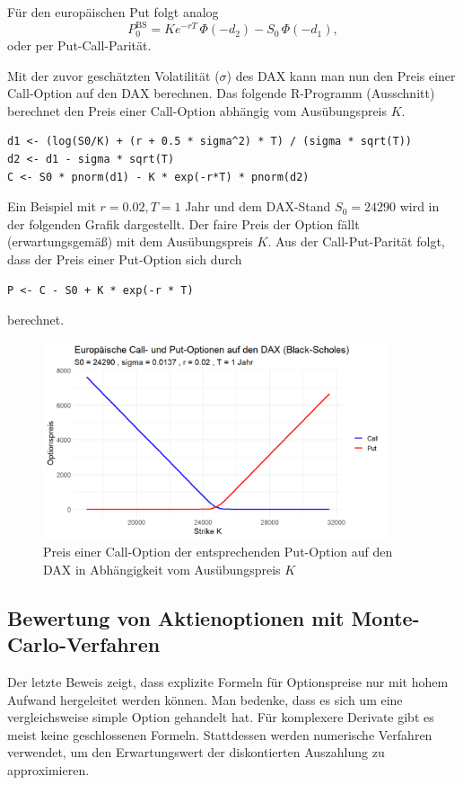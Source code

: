 \begin{bem}
Für den europäischen Put folgt analog
$$
P_0^{\mathrm{BS}} = K e^{-rT}\,\Phi(-d_2) - S_0\,\Phi(-d_1),
$$
oder per Put-Call-Parität.

\end{bem}

\begin{bsp}
Mit der zuvor geschätzten Volatilität ($\sigma$) des DAX kann
man nun den Preis einer Call-Option auf den DAX berechnen. Das folgende
R-Programm (Ausschnitt) berechnet den Preis einer Call-Option abhängig
vom Ausübungspreis $K$.

\begin{lstlisting}
d1 <- (log(S0/K) + (r + 0.5 * sigma^2) * T) / (sigma * sqrt(T))
d2 <- d1 - sigma * sqrt(T)
C <- S0 * pnorm(d1) - K * exp(-r*T) * pnorm(d2)
\end{lstlisting}
Ein Beispiel mit $r = 0.02, T = 1$ Jahr und dem DAX-Stand $S_0 = 24290$ wird in
der folgenden Grafik dargestellt. Der faire Preis der Option
fällt (erwartungsgemäß) mit dem Ausübungspreis $K$.
Aus der Call-Put-Parität folgt, dass der Preis einer Put-Option
sich durch

\begin{lstlisting}
P <- C - S0 + K * exp(-r * T)
\end{lstlisting}
berechnet.

\begin{figure}[H]
    \centering
    \includegraphics[width=0.9\textwidth]{images/dax_bs.png}
    \caption{Preis einer Call-Option der entsprechenden Put-Option auf den DAX in Abhängigkeit vom Ausübungspreis $K$}
    \label{fig:dax_bs}
\end{figure}

\end{bsp}

\subsection{Bewertung von Aktienoptionen mit Monte-Carlo-Verfahren}
Der letzte Beweis zeigt, dass explizite Formeln für Optionspreise nur mit hohem
Aufwand hergeleitet werden können. Man bedenke, dass es sich um eine 
vergleichsweise simple Option gehandelt hat. Für komplexere Derivate
gibt es meist keine geschlossenen Formeln. Stattdessen werden numerische Verfahren
verwendet, um den Erwartungswert der diskontierten Auszahlung zu approximieren.


